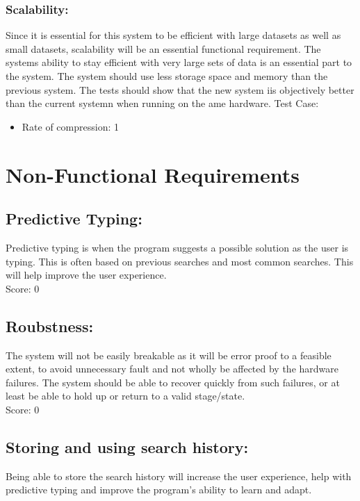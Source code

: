 \documentclass[11pt]{article}
\begin{document}
	\subsubsection{Scalability:}
	Since it is essential for this system to be efficient with large datasets as well as small datasets, scalability will be an essential functional requirement. The systems ability to stay efficient with very large sets of data is an essential part to the system. The system should use less storage space and memory than the previous system. The tests should show that the new system iis objectively better than the current systemn when running on the ame hardware.	
	Test Case:
	\begin{itemize}
      	  	\item Rate of compression: 1
        \end{itemize}

	\section{Non-Functional Requirements}	
	\subsection{Predictive Typing:}
Predictive typing is when the program suggests a possible solution as the user is typing. This is often based on previous searches and most common searches. This will help improve the user experience. \\
    
	Score: 0    
    \subsection{Roubstness:}
The system will not be easily breakable as it will be error proof to a feasible extent, to avoid unnecessary fault and not wholly be affected by the hardware failures. The system should be able to recover quickly from such failures, or at least be able to hold up or return to a valid stage/state.\\
    
	Score: 0    
    \subsection{Storing and using search history:}
	Being able to store the search history will increase the user experience, help with predictive typing and improve the program's ability to learn and adapt.\\
\end{document}
